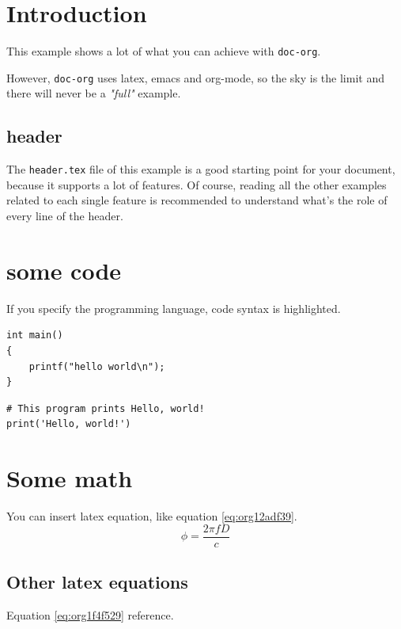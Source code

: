 


\maketitle
\thispagestyle{empty}
\newpage

\tableofcontents
\newpage

\pagestyle{plain}

\section{Introduction}
\label{sec:orged26bb3}
This example shows a lot of what you can achieve with \texttt{doc-org}.

However, \texttt{doc-org} uses latex, emacs and org-mode, so the sky is the limit and
there will never be a \emph{"full"} example.

\subsection{header}
\label{sec:org9b189e1}
The \texttt{header.tex} file of this example is a good starting point for your
document, because it supports a lot of features.
Of course, reading all the other examples related to each single feature is
recommended to understand what's the role of every line of the header.
\section{some code}
\label{sec:orgd085e1f}
If you specify the programming language, code syntax is highlighted.
\begin{verbatim}
int main()
{
    printf("hello world\n");
}
\end{verbatim}

\begin{verbatim}
# This program prints Hello, world!
print('Hello, world!')
\end{verbatim}

\section{Some math}
\label{sec:org07ac312}
You can insert latex equation, like equation \ref{eq:org12adf39}.
\begin{equation}
\label{eq:org12adf39}
\phi = \frac{2\pi fD}{c}
\end{equation}
\subsection{Other latex equations}
\label{sec:org008c16e}
Equation \ref{eq:org1f4f529} reference.

